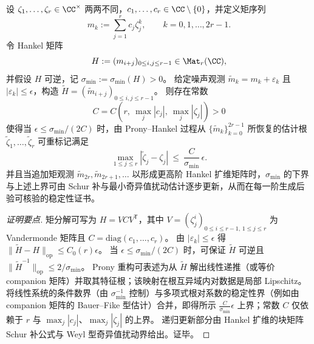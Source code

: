 \begin{theorem}\label{thm:xi-hankel-prony-root-stability-recursive-certificate}
设 \(\zeta_1,\dots,\zeta_r\in\CC^\times\) 两两不同，\(c_1,\dots,c_r\in\CC\setminus\{0\}\)，并定义矩序列
\[
m_k:=\sum_{j=1}^{r}c_j\zeta_j^k,\qquad k=0,1,\dots,2r-1.
\]
令 Hankel 矩阵
\[
H:=(m_{i+j})_{0\le i,j\le r-1}\in\Mat_r(\CC),
\]
并假设 \(H\) 可逆，记 \(\sigma_{\min}:=\sigma_{\min}(H)>0\)。
给定噪声观测 \(\tilde m_k=m_k+\varepsilon_k\) 且 \(|\varepsilon_k|\le \epsilon\)，构造 \(\tilde H=(\tilde m_{i+j})_{0\le i,j\le r-1}\)。
则存在常数
\[
C=C\!\left(r,\ \max_j|c_j|,\ \max_j|\zeta_j|\right)>0
\]
使得当 \(\epsilon\le \sigma_{\min}/(2C)\) 时，由 Prony--Hankel 过程从 \(\{\tilde m_k\}_{k=0}^{2r-1}\) 所恢复的估计根 \(\tilde\zeta_1,\dots,\tilde\zeta_r\) 可重标记满足
\[
\max_{1\le j\le r}|\tilde\zeta_j-\zeta_j|\ \le\ \frac{C}{\sigma_{\min}}\,\epsilon.
\]
并且当追加矩观测 \(\tilde m_{2r},\tilde m_{2r+1},\dots\) 以形成更高阶 Hankel 扩维矩阵时，\(\sigma_{\min}\) 的下界与上述上界可由 Schur 补与最小奇异值扰动估计逐步更新，从而在每一阶生成后验可核验的稳定性证书。
\end{theorem}
\begin{proof}[证明要点]
矩分解可写为 \(H=VCV^{\mathsf T}\)，其中 \(V=(\zeta_j^i)_{0\le i\le r-1,\,1\le j\le r}\) 为 Vandermonde 矩阵且 \(C=\mathrm{diag}(c_1,\dots,c_r)\)。
由 \(|\varepsilon_k|\le\epsilon\) 得 \(\|\tilde H-H\|_{\mathrm{op}}\le C_0(r)\epsilon\)。
当 \(\epsilon\le \sigma_{\min}/(2C)\) 时，可保证 \(\tilde H\) 可逆且 \(\|\tilde H^{-1}\|_{\mathrm{op}}\le 2/\sigma_{\min}\)。
Prony 重构可表述为从 \(\tilde H\) 解出线性递推（或等价 companion 矩阵）并取其特征根；该映射在根互异域内对数据是局部 Lipschitz。
将线性系统的条件数界（由 \(\sigma_{\min}^{-1}\) 控制）与多项式根对系数的稳定性界（例如由 companion 矩阵的 Bauer--Fike 型估计）合并，即得所示 \(\frac{C}{\sigma_{\min}}\epsilon\) 上界；常数 \(C\) 仅依赖于 \(r\) 与 \(\max_j|c_j|\)、\(\max_j|\zeta_j|\) 的上界。
递归更新部分由 Hankel 扩维的块矩阵 Schur 补公式与 Weyl 型奇异值扰动界给出。证毕。
\end{proof}


